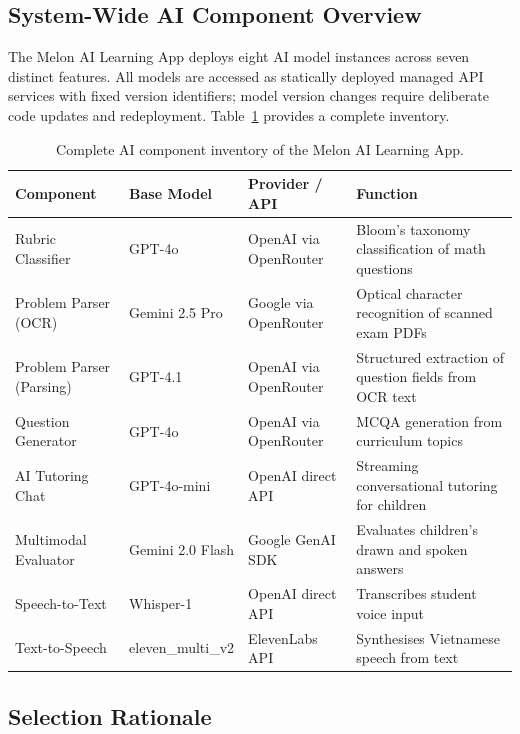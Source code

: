 \documentclass[12pt, a4paper]{article}
\begin{document}
\subsection{System-Wide AI Component Overview}

The Melon AI Learning App deploys eight AI model instances across seven distinct features. All models are accessed as statically deployed managed API services with fixed version identifiers; model version changes require deliberate code updates and redeployment. Table~\ref{tab:component-inventory} provides a complete inventory.

\begin{table}[H]
\centering
\caption{Complete AI component inventory of the Melon AI Learning App.}
\label{tab:component-inventory}
\small
\begin{tabularx}{\textwidth}{l l l X}
\toprule
\textbf{Component} & \textbf{Base Model} & \textbf{Provider / API} & \textbf{Function} \\
\midrule
Rubric Classifier         & GPT-4o            & OpenAI via OpenRouter      & Bloom's taxonomy classification of math questions \\
Problem Parser (OCR)      & Gemini 2.5 Pro    & Google via OpenRouter      & Optical character recognition of scanned exam PDFs \\
Problem Parser (Parsing)  & GPT-4.1           & OpenAI via OpenRouter      & Structured extraction of question fields from OCR text \\
Question Generator        & GPT-4o            & OpenAI via OpenRouter      & MCQA generation from curriculum topics \\
\midrule
AI Tutoring Chat          & GPT-4o-mini       & OpenAI direct API          & Streaming conversational tutoring for children \\
Multimodal Evaluator      & Gemini 2.0 Flash  & Google GenAI SDK           & Evaluates children's drawn and spoken answers \\
Speech-to-Text            & Whisper-1         & OpenAI direct API          & Transcribes student voice input \\
Text-to-Speech            & eleven\_multi\_v2 & ElevenLabs API             & Synthesises Vietnamese speech from text \\
\bottomrule
\end{tabularx}
\end{table}

\subsection{Selection Rationale}
\end{document}
